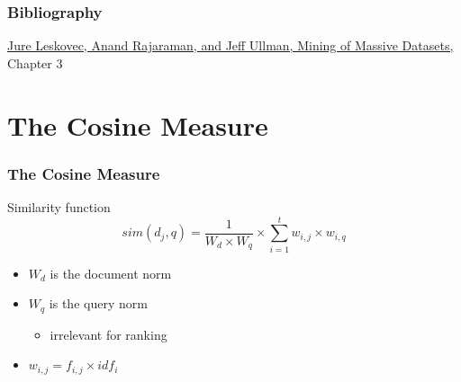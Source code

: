 \documentclass[svgnames]{beamer}
\subtitle{Similarity Search}
\begin{document}
\maketitle
\makeoutline

\begin{frame}
    \frametitle{Bibliography}
    \href{http://www.mmds.org}{Jure Leskovec, Anand Rajaraman, and Jeff Ullman, Mining of Massive Datasets,} Chapter 3
\end{frame}

\section{The Cosine Measure}

\begin{frame}
  \frametitle{The Cosine Measure}
  
  \begin{block}{Similarity function}
    \begin{displaymath}
      sim(d_j,q) =
         \frac{1}{W_d \times W_q}
         \times \sum_{i=1}^{t}w_{i,j} \times w_{i,q}
    \end{displaymath}
    \begin{itemize}
    \item $W_d$ is the document norm
    \item $W_q$ is the query norm
      \begin{itemize}
      \item irrelevant for ranking
      \end{itemize}
    \item $w_{i,j} = f_{i,j} \times idf_i$
    \end{itemize}
  \end{block}

\end{frame}

\end{document}

